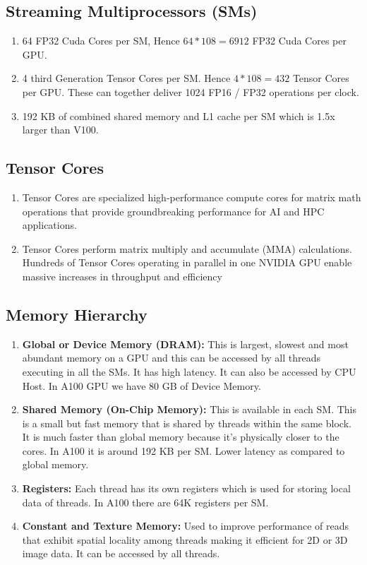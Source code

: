 \documentclass{article}
\begin{document}
\subsection*{Streaming Multiprocessors (SMs)}
\begin{enumerate}
    \item 64 FP32 Cuda Cores per SM, Hence $64 * 108 = 6912$ FP32 Cuda Cores per GPU.
    \item 4 third Generation Tensor Cores per SM. Hence $4 * 108 = 432$ Tensor Cores per GPU. These can together deliver 1024 FP16 / FP32 operations per clock.
    \item 192 KB of combined shared memory and L1 cache per SM which is 1.5x larger than V100.
\end{enumerate}

\subsection*{Tensor Cores}
\begin{enumerate}
    \item Tensor Cores are specialized high-performance compute cores for matrix math operations that provide groundbreaking performance for AI and HPC applications. 
    \item Tensor Cores perform matrix
    multiply and accumulate (MMA) calculations. Hundreds of Tensor Cores operating in parallel in one NVIDIA GPU enable massive increases in throughput and efficiency
\end{enumerate}

\subsection*{Memory Hierarchy}
\begin{enumerate}
    \item \textbf{Global or Device Memory (DRAM): }This is largest, slowest and most abundant memory on a GPU and this can be accessed by all threads executing in all the SMs. It has high latency. It can also be accessed by CPU Host. In A100 GPU we have 80 GB of Device Memory.
    \item \textbf{Shared Memory (On-Chip Memory): }This is available in each SM. This is a small but fast memory that is shared by threads within the same block. It is much faster than global memory because it's physically closer to the cores. In A100 it is around 192 KB per SM. Lower latency as compared to global memory.
    \item \textbf{Registers: } Each thread has its own registers which is used for storing local data of threads. In A100 there are 64K registers per SM.
    \item \textbf{Constant and Texture Memory: } Used to improve performance of reads that exhibit spatial locality among threads making it efficient for 2D or 3D image data. It can be accessed by all threads.
\end{enumerate}
\end{document}
